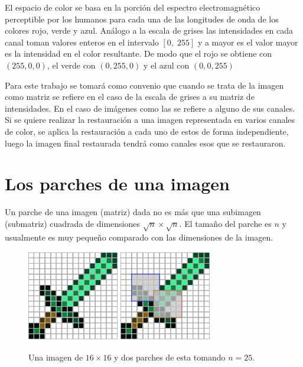 El espacio de color \RGB se basa en la porción del espectro electromagnético perceptible por los humanos para cada una de las longitudes de onda de los colores rojo, verde y azul. An\'alogo a la escala de grises las intensidades en cada canal toman valores enteros en el intervalo $[0,\; 255]$ y a mayor es el valor mayor es la intensidad en el color resultante. De modo que el rojo se obtiene con $(255,0,0)$, el verde con $(0,255,0)$ y el azul con $(0,0,255)$

Para este trabajo se tomar\'a como convenio que cuando se trata de la imagen como matriz se refiere en el caso de la escala de grises a su matriz de intensidades. En el caso de im\'agenes como las \RGB se refiere a alguno de sus canales. Si se quiere realizar la restauraci\'on a una imagen representada en varios canales de color, se aplica la restauraci\'on a cada uno de estos de forma independiente, luego la imagen final restaurada tendr\'a como canales esos que se restauraron.


\section{Los parches de una imagen}\label{sec:patches}

\begin{definition}
	Un parche  de una imagen (matriz) dada no es m\'as que una subimagen (submatriz) cuadrada de dimensiones $\sqrt{n} \times \sqrt{n}$. El tamaño del parche es $n$ y usualmente es muy peque\~no comparado con las dimensiones de la imagen.
\end{definition}

\begin{figure}[h]
	\centering
	\includegraphics[width=4cm, height=4cm]{Graphics/diamon_sword.png}
	\hspace{1cm}
	\includegraphics[width=4cm, height=4cm]{Graphics/diamon_sword_with_patches.png}
	\caption{Una imagen de $16 \times 16$ y dos parches de esta tomando $n = 25$.}
	\label{ex:patches}
\end{figure}

